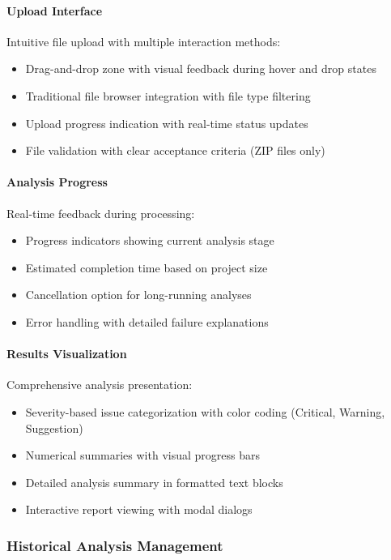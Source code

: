 \documentclass[12pt,a4paper]{article}
\begin{document}
    \paragraph{Upload Interface}
    Intuitive file upload with multiple interaction methods:
    \begin{itemize}[leftmargin=0.5in]
        \item Drag-and-drop zone with visual feedback during hover and drop states
        \item Traditional file browser integration with file type filtering
        \item Upload progress indication with real-time status updates
        \item File validation with clear acceptance criteria (ZIP files only)
    \end{itemize}

    \paragraph{Analysis Progress}
    Real-time feedback during processing:
    \begin{itemize}[leftmargin=0.5in]
        \item Progress indicators showing current analysis stage
        \item Estimated completion time based on project size
        \item Cancellation option for long-running analyses
        \item Error handling with detailed failure explanations
    \end{itemize}

    \paragraph{Results Visualization}
    Comprehensive analysis presentation:
    \begin{itemize}[leftmargin=0.5in]
        \item Severity-based issue categorization with color coding (Critical, Warning, Suggestion)
        \item Numerical summaries with visual progress bars
        \item Detailed analysis summary in formatted text blocks
        \item Interactive report viewing with modal dialogs
    \end{itemize}

    \subsubsection{Historical Analysis Management}
\end{document}
